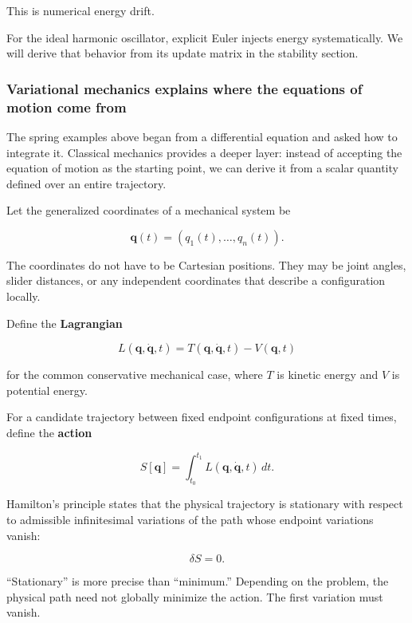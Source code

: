 This is numerical energy drift.

For the ideal harmonic oscillator, explicit Euler injects energy systematically. We will derive that behavior from its update matrix in the stability section.

\subsubsection{Variational mechanics explains where the equations of motion come from}\label{02-foundations-ii-ch025-variational-mechanics-explains-where-the-equations-of-motion-come-from}

\hypertarget{02-foundations-ii-ch025-variational-mechanics-explains-where-the-equations-of-motion-come-from}{}

The spring examples above began from a differential equation and asked how to integrate it. Classical mechanics provides a deeper layer: instead of accepting the equation of motion as the starting point, we can derive it from a scalar quantity defined over an entire trajectory.

Let the generalized coordinates of a mechanical system be

\[
\mathbf q(t)
=
(q_1(t),\ldots,q_n(t)).
\]

The coordinates do not have to be Cartesian positions. They may be joint angles, slider distances, or any independent coordinates that describe a configuration locally.

Define the \textbf{Lagrangian}

\[
\boxed{
L(\mathbf q,\dot{\mathbf q},t)
=
T(\mathbf q,\dot{\mathbf q},t)
-
V(\mathbf q,t)
}
\]

for the common conservative mechanical case, where \(T\) is kinetic energy and \(V\) is potential energy.

For a candidate trajectory between fixed endpoint configurations at fixed times, define the \textbf{action}

\[
\boxed{
S[\mathbf q]
=
\int_{t_0}^{t_1}
L(\mathbf q,\dot{\mathbf q},t)\,dt
}.
\]

Hamilton's principle states that the physical trajectory is stationary with respect to admissible infinitesimal variations of the path whose endpoint variations vanish:

\[
\delta S=0.
\]

``Stationary'' is more precise than ``minimum.'' Depending on the problem, the physical path need not globally minimize the action. The first variation must vanish.

